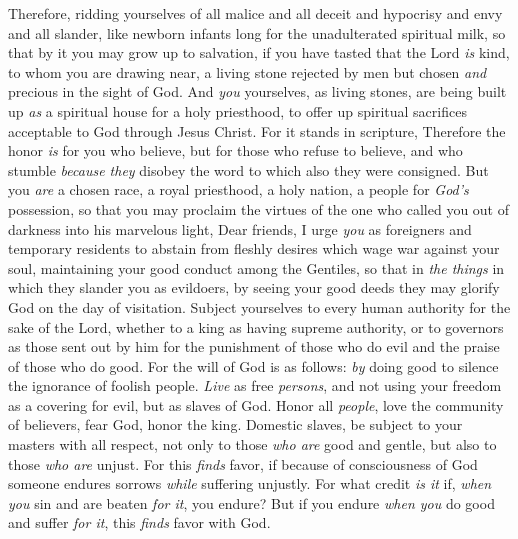\begin{biblechapter} %
 Therefore, ridding yourselves of all malice and all deceit and hypocrisy and envy and all slander,
\verse like newborn infants long for the unadulterated spiritual milk, so that by it you may grow up to salvation,
\verse if you have tasted that the Lord \textit{is} kind,
\verse to whom you are drawing near, a living stone rejected by men but chosen \textit{and} precious in the sight of God.
\verse And \textit{you} yourselves, as living stones, are being built up \textit{as} a spiritual house for a holy priesthood, to offer up spiritual sacrifices acceptable to God through Jesus Christ.
\verse For it stands in scripture,
\verse Therefore the honor \textit{is} for you who believe, but for those who refuse to believe,
\verse and
\verse who stumble \textit{because they} disobey the word to which also they were consigned.
\verse But you \textit{are} a chosen race, a royal priesthood, a holy nation, a people for \textit{God’s} possession, so that you may proclaim the virtues of the one who called you out of darkness into his marvelous light,
\verse Dear friends, I urge \textit{you} as foreigners and temporary residents to abstain from fleshly desires which wage war against your soul,
\verse maintaining your good conduct among the Gentiles, so that in \textit{the things} in which they slander you as evildoers, by seeing your good deeds they may glorify God on the day of visitation.
 Subject yourselves to every human authority for the sake of the Lord, whether to a king as having supreme authority,
\verse or to governors as those sent out by him for the punishment of those who do evil and the praise of those who do good.
\verse For the will of God is as follows: \textit{by} doing good to silence the ignorance of foolish people.
\verse \textit{Live} as free \textit{persons}, and not using your freedom as a covering for evil, but as slaves of God.
\verse Honor all \textit{people}, love the community of believers, fear God, honor the king.
\verse Domestic slaves, be subject to your masters with all respect, not only to those \textit{who are} good and gentle, but also to those \textit{who are} unjust.
\verse For this \textit{finds} favor, if because of consciousness of God someone endures sorrows \textit{while} suffering unjustly.
\verse For what credit \textit{is it} if, \textit{when you} sin and are beaten \textit{for it}, you endure? But if you endure \textit{when you} do good and suffer \textit{for it}, this \textit{finds} favor with God.

\end{biblechapter}
